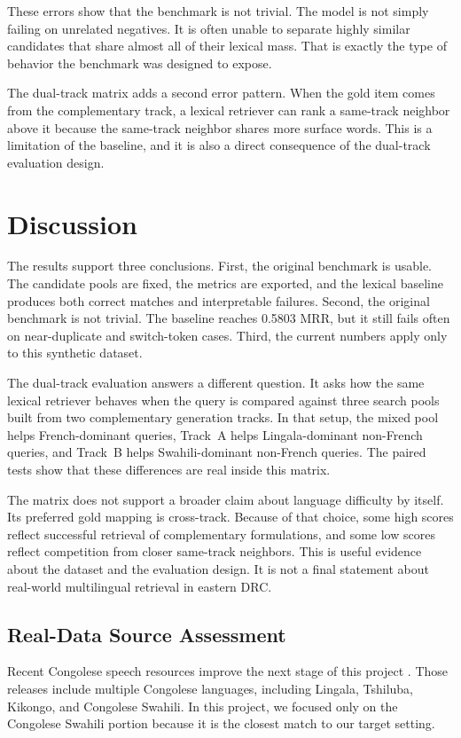 \documentclass[11pt,twocolumn]{article}
\begin{document}
These errors show that the benchmark is not trivial. The model is not simply failing on unrelated negatives. It is often unable to separate highly similar candidates that share almost all of their lexical mass. That is exactly the type of behavior the benchmark was designed to expose.

The dual-track matrix adds a second error pattern. When the gold item comes from the complementary track, a lexical retriever can rank a same-track neighbor above it because the same-track neighbor shares more surface words. This is a limitation of the baseline, and it is also a direct consequence of the dual-track evaluation design.

\section{Discussion}
The results support three conclusions. First, the original benchmark is usable. The candidate pools are fixed, the metrics are exported, and the lexical baseline produces both correct matches and interpretable failures. Second, the original benchmark is not trivial. The baseline reaches 0.5803 MRR, but it still fails often on near-duplicate and switch-token cases. Third, the current numbers apply only to this synthetic dataset.

The dual-track evaluation answers a different question. It asks how the same lexical retriever behaves when the query is compared against three search pools built from two complementary generation tracks. In that setup, the mixed pool helps French-dominant queries, Track~A helps Lingala-dominant non-French queries, and Track~B helps Swahili-dominant non-French queries. The paired tests show that these differences are real inside this matrix.

The matrix does not support a broader claim about language difficulty by itself. Its preferred gold mapping is cross-track. Because of that choice, some high scores reflect successful retrieval of complementary formulations, and some low scores reflect competition from closer same-track neighbors. This is useful evidence about the dataset and the evaluation design. It is not a final statement about real-world multilingual retrieval in eastern DRC.

\subsection{Real-Data Source Assessment}
Recent Congolese speech resources improve the next stage of this project \cite{kimanuka2024speech,kimanuka2023mendeley,ussen2024cdwav2vec}. Those releases include multiple Congolese languages, including Lingala, Tshiluba, Kikongo, and Congolese Swahili. In this project, we focused only on the Congolese Swahili portion because it is the closest match to our target setting.
\end{document}
